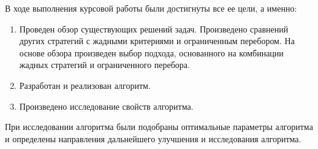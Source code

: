 В ходе выполнения курсовой работы были достигнуты все ее цели, а именно:
\begin{enumerate}
    \item Проведен обзор существующих решений задач. Произведено сравнений других стратегий с жадными критериями и ограниченным перебором. На основе обзора произведен выбор подхода, основанного на комбинации жадных стратегий и ограниченного перебора. 
    \item Разработан и реализован алгоритм.
    \item Произведено исследование свойств алгоритма.
\end{enumerate}

При исследовании алгоритма были подобраны оптимальные параметры алгоритма и определены направления дальнейшего улучшения и исследования алгоритма.